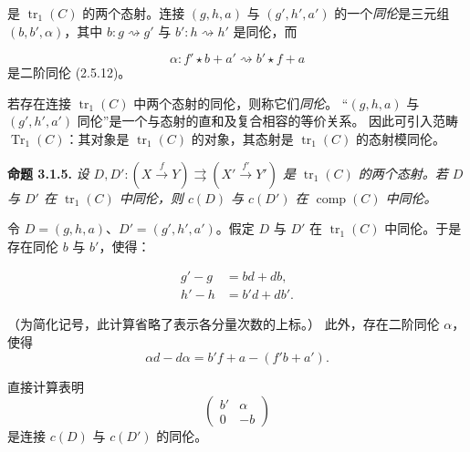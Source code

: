 \clearpage
{}%
是 $\operatorname{tr}_1(C)$ 的两个态射。连接 $(g,h,a)$ 与
$(g',h',a')$ 的一个\emph{同伦}是三元组 $(b,b',\alpha)$，其中
$b\colon g\rightsquigarrow g'$ 与 $b'\colon h\rightsquigarrow h'$ 是同伦，而

\begin{equation*}
  \alpha\colon f'\star b+a'\rightsquigarrow b'\star f+a
\end{equation*}
是二阶同伦 (2.5.12)。

若存在连接 $\operatorname{tr}_1(C)$ 中两个态射的同伦，则称它们\emph{同伦}。
“$(g,h,a)$ 与 $(g',h',a')$ 同伦”是一个与态射的直和及复合相容的等价关系。
因此可引入范畴 $\operatorname{Tr}_1(C)$：其对象是
$\operatorname{tr}_1(C)$ 的对象，其态射是 $\operatorname{tr}_1(C)$ 的态射模同伦。

\noindent\textbf{命题 3.1.5.}\quad
\emph{设
$D,D'\colon (X\xrightarrow{f}Y)\rightrightarrows
(X'\xrightarrow{f'}Y')$ 是 $\operatorname{tr}_1(C)$ 的两个态射。若
$D$ 与 $D'$ 在 $\operatorname{tr}_1(C)$ 中同伦，则 $c(D)$ 与 $c(D')$
在 $\operatorname{comp}(C)$ 中同伦。}

令 $D=(g,h,a)$、$D'=(g',h',a')$。假定 $D$ 与 $D'$ 在
$\operatorname{tr}_1(C)$ 中同伦。于是存在同伦 $b$ 与 $b'$，使得：

\begin{equation}
  \begin{aligned}
    g'-g&=bd+db,\\
    h'-h&=b'd+db'.
  \end{aligned}
  \tag{3.1.5.1}
\end{equation}

（为简化记号，此计算省略了表示各分量次数的上标。）
此外，存在二阶同伦 $\alpha$，使得
\begin{equation*}
  \alpha d-d\alpha=b'f+a-(f'b+a').
\end{equation*}

直接计算表明
\begin{equation*}
  \begin{pmatrix}
    b' & \alpha\\
    0  & -b
  \end{pmatrix}
\end{equation*}
是连接 $c(D)$ 与 $c(D')$ 的同伦。

